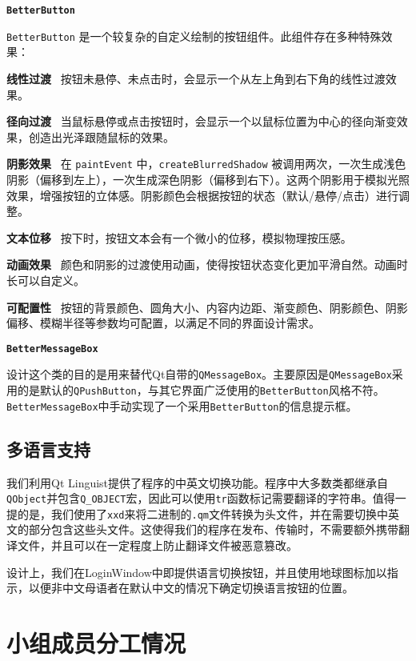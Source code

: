 \documentclass{article}
\begin{document}
\noindent \textbf{\texttt{BetterButton}}

\texttt{BetterButton} 是一个较复杂的自定义绘制的按钮组件。此组件存在多种特殊效果：

\textbf{线性过渡} \  按钮未悬停、未点击时，会显示一个从左上角到右下角的线性过渡效果。

\textbf{径向过渡} \  当鼠标悬停或点击按钮时，会显示一个以鼠标位置为中心的径向渐变效果，创造出光泽跟随鼠标的效果。

\textbf{阴影效果} \  在 \texttt{paintEvent} 中，\texttt{createBlurredShadow} 被调用两次，一次生成浅色阴影（偏移到左上），一次生成深色阴影（偏移到右下）。这两个阴影用于模拟光照效果，增强按钮的立体感。阴影颜色会根据按钮的状态（默认/悬停/点击）进行调整。

\textbf{文本位移} \  按下时，按钮文本会有一个微小的位移，模拟物理按压感。

\textbf{动画效果} \  颜色和阴影的过渡使用动画，使得按钮状态变化更加平滑自然。动画时长可以自定义。

\textbf{可配置性} \  按钮的背景颜色、圆角大小、内容内边距、渐变颜色、阴影颜色、阴影偏移、模糊半径等参数均可配置，以满足不同的界面设计需求。

\noindent \textbf{\texttt{BetterMessageBox}}

设计这个类的目的是用来替代Qt自带的\texttt{QMessageBox}。主要原因是\texttt{QMessageBox}采用的是默认的\texttt{QPushButton}，与其它界面广泛使用的\texttt{BetterButton}风格不符。\texttt{BetterMessageBox}中手动实现了一个采用\texttt{BetterButton}的信息提示框。

\subsection{多语言支持} \label{i18n}

我们利用Qt Linguist提供了程序的中英文切换功能。程序中大多数类都继承自\texttt{QObject}并包含\texttt{Q\_OBJECT}宏，因此可以使用\texttt{tr}函数标记需要翻译的字符串。值得一提的是，我们使用了\texttt{xxd}来将二进制的\texttt{.qm}文件转换为头文件，并在需要切换中英文的部分包含这些头文件。这使得我们的程序在发布、传输时，不需要额外携带翻译文件，并且可以在一定程度上防止翻译文件被恶意篡改。

设计上，我们在LoginWindow中即提供语言切换按钮，并且使用地球图标加以指示，以便非中文母语者在默认中文的情况下确定切换语言按钮的位置。



\section{小组成员分工情况}
\end{document}
